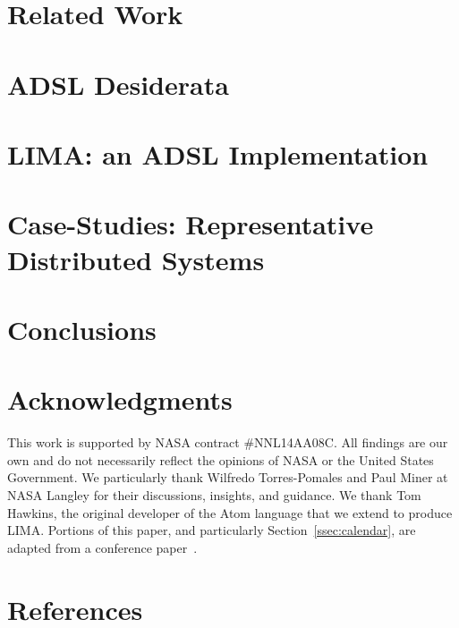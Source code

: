 \documentclass{AIAA_REVTeX41/AIAA}
\begin{document}
\section{Related Work}
\label{sec:current}



\section{ADSL Desiderata}
\label{sec:towards-adsl}



\section{LIMA: an ADSL Implementation}
\label{sec:adsl}



\section{Case-Studies: Representative Distributed Systems}
\label{sec:case-studies}






\section{Conclusions}
\label{sec:future-work}


\section*{Acknowledgments}
This work is supported by NASA contract \#NNL14AA08C. All findings are our own and do not necessarily reflect the opinions of NASA or the United States Government.
We particularly thank Wilfredo Torres-Pomales and Paul Miner at NASA Langley for their discussions, insights, and guidance. We thank Tom Hawkins, the original developer of the Atom language that we extend to produce LIMA.
Portions of this paper, and particularly Section~\ref{ssec:calendar}, are adapted from a conference paper~\cite{jones:nfm17}.

\section*{References}

%

\end{document}
